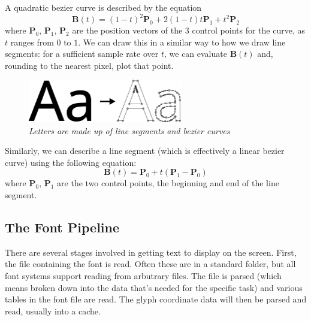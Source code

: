 \documentclass{report}
\begin{document}
A quadratic bezier curve is described by the equation
\begin{equation*}
\mathbf{B}(t) = (1 - t)^2\mathbf{P}_0 +2(1 - t)t\mathbf{P}_1 + t^2\mathbf{P}_2
\end{equation*}
where $\mathbf{P}_0$, $\mathbf{P}_1$, $\mathbf{P}_2$ are the position vectors of
the 3 control points for the curve, as $t$ ranges from $0$ to $1$. We can draw
this in a similar way to how we draw line segments: for a sufficient sample rate
over $t$, we can evaluate $\mathbf{B}(t)$ and, rounding to the nearest pixel,
plot that point.
\begin{figure}[t]
\centering
\includegraphics[width=0.6\textwidth]{outlineimg}
\caption{\textit{Letters are made up of line segments and bezier curves}}
\end{figure}
Similarly, we can describe a line segment (which is effectively a linear bezier
curve) using the following equation:
\begin{equation*}
  \mathbf{B}(t) = \mathbf{P}_0 + t(\mathbf{P}_1 - \mathbf{P}_0)
\end{equation*}
where $\mathbf{P}_0$, $\mathbf{P}_1$ are the two control points, the beginning
and end of the line segment. 

\subsection{The Font Pipeline}

There are several stages involved in getting text to display on the screen.
First, the file containing the font is read. Often these are in a standard
folder, but all font systems support reading from arbutrary files. The file is
parsed (which means broken down into the data that's needed for the specific
task) and various tables in the font file are read. The glyph coordinate data
will then be parsed and read, usually into a cache.
\end{document}

